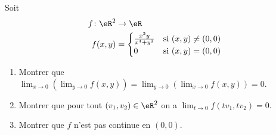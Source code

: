 \begin{exercice}[\minsyndical]\label{exoLimiteContinue0008}

Soit 
\begin{equation}
	\begin{aligned}
		f\colon \eR^2&\to \eR \\
		f(x,y)&=
		\begin{cases}
			\frac{x^2 y }{x^4 + y^2} 	&	\text{si $(x,y)\neq (0,0)$}\\
			0	&	 \text{si $(x,y)=(0,0)$}
		\end{cases}
	\end{aligned}
\end{equation}
\begin{enumerate}
	\item
Montrer que  $\lim_{x\to 0} (\lim_{y \to 0} f(x,y)) = \lim_{y\to 0} (\lim_{x \to 0} f(x,y)) = 0$.
\item
Montrer que pour tout $ (v_1, v_2 ) \in \eR^2$ on a 
$ \lim_{t\to 0 } f(tv_1, tv_2) = 0$.
\item
 Montrer que $f$ n'est pas continue en $(0,0)$.

		
\end{enumerate}

\end{exercice}
